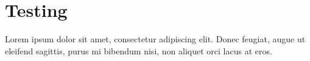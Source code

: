 \chapter{Testing}
Lorem ipsum dolor sit amet, consectetur adipiscing elit. Donec feugiat, augue
ut eleifend sagittis, purus mi bibendum nisi, non aliquet orci lacus at eros.
